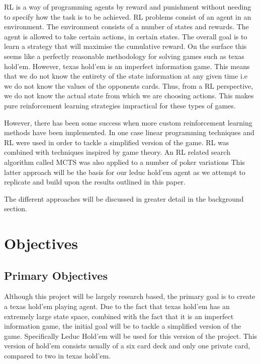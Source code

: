 RL is a way of programming agents by reward and punishment without needing to specify how the
task is to be achieved\citep{kaelbling1996reinforcement}.
RL problems consist of an agent in an environment.
The environment consists of a number of states and rewards.
The agent is allowed to take certain actions, in certain states.
The overall goal is to learn a strategy that will maximise the cumulative reward.
On the surface this seems like a perfectly reasonable methodology for solving games such as texas hold'em.
However, texas hold'em is an imperfect information game.
This means that we do not know the entirety of the state information at any given time
i.e we do not know the values of the opponents cards.
Thus, from a RL perspective, we do not know the actual state from which we are choosing actions.
This makes pure reinforcement learning strategies impractical for these types of games.

However, there has been some success when more custom reinforcement learning methods have been implemented.
In one case linear programming techniques and RL were used in order to tackle a
simplified version of the game\citep{dahl2001reinforcement}.
RL was combined with techniques inspired by game theory\citep{heinrich2015fictitious}.
An RL related search algorithm called MCTS was also applied to a number of poker variations\citep{heinrich2017reinforcement}
This latter approach will be the basis for our leduc hold'em agent as we attempt to replicate and
build upon the results outlined in this paper.

The different approaches will be discussed in greater detail in the background section.

\section{Objectives}\label{sec:objectives}
\subsection{Primary Objectives}\label{subsec:primaryObjectives}

Although this project will be largely research based, the primary goal is to create a texas hold'em
playing agent.
Due to the fact that texas hold'em has an extremely large state space, combined with the fact that it
is an imperfect information game, the initial goal will be to tackle a simplified version of the game.
Specifically Leduc Hold'em will be used for this version of the project.
This version of hold'em consists usually of a six card deck and only one private card, compared to two in texas hold'em.

